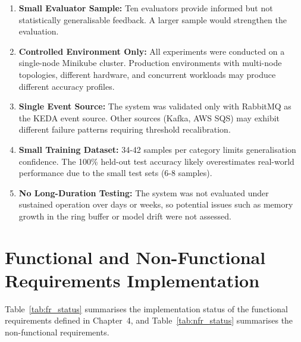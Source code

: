 \begin{enumerate}
    \item \textbf{Small Evaluator Sample:} Ten evaluators provide informed but not statistically generalisable feedback. A larger sample would strengthen the evaluation.
    \item \textbf{Controlled Environment Only:} All experiments were conducted on a single-node Minikube cluster. Production environments with multi-node topologies, different hardware, and concurrent workloads may produce different accuracy profiles.
    \item \textbf{Single Event Source:} The system was validated only with RabbitMQ as the KEDA event source. Other sources (Kafka, AWS SQS) may exhibit different failure patterns requiring threshold recalibration.
    \item \textbf{Small Training Dataset:} 34-42 samples per category limits generalisation confidence. The 100\% held-out test accuracy likely overestimates real-world performance due to the small test sets (6-8 samples).
    \item \textbf{No Long-Duration Testing:} The system was not evaluated under sustained operation over days or weeks, so potential issues such as memory growth in the ring buffer or model drift were not assessed.
\end{enumerate}

\section{Functional and Non-Functional Requirements Implementation}
Table~\ref{tab:fr_status} summarises the implementation status of the functional requirements defined in Chapter~4, and Table~\ref{tab:nfr_status} summarises the non-functional requirements.

